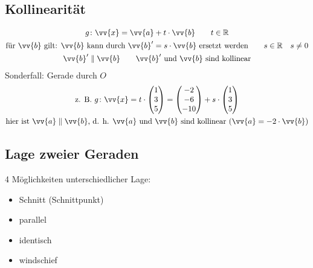 \subsection{Kollinearität}
\begin{gather*}
  g \colon \vv{x} = \vv{a} + t \cdot \vv{b} \qquad t \in \mathbb{R} \\
  \text{für $\vv{b}$ gilt: $\vv{b}$ kann durch $\vv{b}' = s \cdot \vv{b}$ ersetzt werden} \qquad s \in \mathbb{R} \quad s \neq 0 \\
  \vv{b}' \parallel \vv{b} \qquad \text{$\vv{b}'$ und $\vv{b}$ sind kollinear}
\end{gather*}
Sonderfall: Gerade durch $O$
\begin{gather*}
  \text{z. B. } g \colon \vv{x} = t \cdot \begin{pmatrix}1 \\ 3 \\ 5\end{pmatrix} = \begin{pmatrix}-2 \\ -6 \\ -10\end{pmatrix} + s \cdot \begin{pmatrix}1 \\ 3 \\ 5\end{pmatrix} \\
  \text{hier ist $\vv{a} \parallel \vv{b}$, d. h. $\vv{a}$ und $\vv{b}$ sind kollinear ($\vv{a} = -2 \cdot \vv{b}$)}
\end{gather*}
\subsection{Lage zweier Geraden}
4 Möglichkeiten unterschiedlicher Lage:
\begin{itemize}
  \item Schnitt (Schnittpunkt)
  \item parallel
  \item identisch
  \item windschief
\end{itemize}
